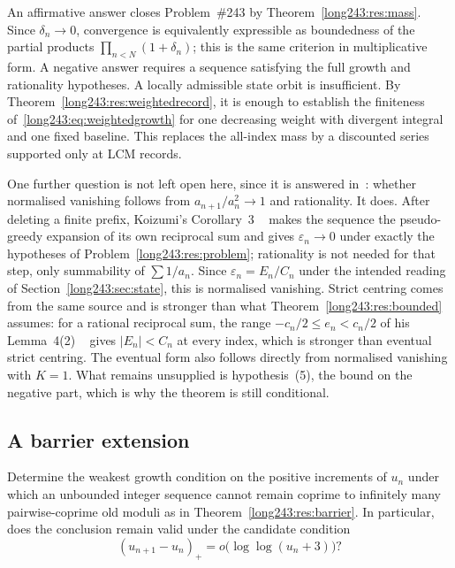 \documentclass[11pt]{article}
\begin{document}
\noindent An affirmative answer closes Problem~\#243 by
Theorem~\ref{long243:res:mass}.  Since $\delta_n\to0$, convergence is equivalently
expressible as boundedness of the partial products
$\prod_{n<N}(1+\delta_n)$; this is the same criterion in multiplicative form.
A negative answer requires a sequence satisfying the full growth and
rationality hypotheses. A locally admissible state orbit is insufficient.
By Theorem~\ref{long243:res:weightedrecord}, it is enough to establish the finiteness
of~\eqref{long243:eq:weightedgrowth} for one decreasing weight with divergent
integral and one fixed baseline. This replaces the all-index mass by a
discounted series supported only at LCM records.

\begin{remark}
One further question is not left open here, since it is answered
in~\cite{koizumi2025}: whether normalised vanishing follows from
$a_{n+1}/a_n^{2}\to1$ and rationality.  It does.  After
deleting a finite prefix, Koizumi's Corollary~3
~\cite[p.~9]{koizumi2025} makes the sequence the pseudo-greedy expansion of its
own reciprocal sum and gives $\varepsilon_n\to0$ under exactly the hypotheses of
Problem~\ref{long243:res:problem}; rationality is not needed for that step, only
summability of $\sum1/a_n$.  Since $\varepsilon_n=E_n/C_n$ under the intended
reading of Section~\ref{long243:sec:state}, this is normalised vanishing.  Strict
centring comes from the same source and is stronger than what
Theorem~\ref{long243:res:bounded} assumes: for a rational reciprocal sum, the range
$-c_n/2\le e_n<c_n/2$ of his Lemma~4(2)
~\cite[pp.~11--12]{koizumi2025} gives $|E_n|<C_n$ at every index, which is stronger
than eventual strict centring.  The eventual form also follows directly from
normalised vanishing with $K=1$.  What remains unsupplied is hypothesis~(5), the bound
on the negative part, which is why the theorem is still conditional.
\end{remark}

\subsection{A barrier extension}

\begin{problem}\label{long243:res:variablerise}
Determine the weakest growth condition on the positive increments of $u_n$
under which an unbounded integer sequence cannot remain coprime to infinitely
many pairwise-coprime old moduli as in Theorem~\ref{long243:res:barrier}.  In
particular, does the conclusion remain valid under the candidate condition
\[
 (u_{n+1}-u_n)_+=o\bigl(\log\log(u_n+3)\bigr)?
\]
\end{problem}
\end{document}
